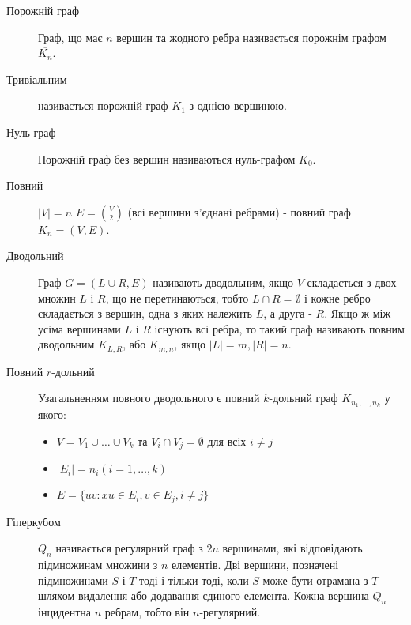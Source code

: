 \begin{description}
        \item[Порожній граф] Граф, що має $n$ вершин та жодного ребра називається порожнім графом $\overline{K_n}$.
        \item[Тривіальним] називається порожній граф $K_1$ з однією вершиною.
        \item[Нуль-граф] Порожній граф без вершин називаються нуль-графом $K_0$.
        \item[Повний] $\vert V \vert = n$ $E = {V \choose 2}$ (всі вершини з'єднані ребрами) - повний граф $K_n = (V,E)$.
        \item[Дводольний] Граф $G = (L \cup R,E)$ називають дводольним, якщо $V$ складається з двох множин $L$ і $R$, що не перетинаються, тобто $L \cap R = \emptyset$ і кожне ребро складається з вершин, одна з яких належить $L$, а друга - $R$. Якщо ж між усіма вершинами $L$ і $R$ існують всі ребра, то такий граф називають повним дводольним $K_{L,R}$, або $K_{m,n}$, якщо $\vert L \vert = m, \vert R \vert = n$.
        \item[Повний $r$-дольний] Узагальненням повного дводольного є повний $k$-дольний граф $K_{n_1,\dots,n_k}$ у якого:
        \begin{itemize}     
        \item $V=V_1 \cup \dots \cup V_k$ та $V_i \cap V_j = \emptyset$ для всіх $i \ne j$
        \item $\vert E_i \vert = n_i (i=1,\dots,k)$
        \item $E = \lbrace uv : xu \in E_i, v \in E_j, i \ne j \rbrace$
        \end{itemize}
        \item[Гіперкубом] $Q_n$ називається регулярний граф з $2n$ вершинами, які відповідають підмножинам множини з $n$ елементів. Дві вершини, позначені підмножинами $S$ і $T$ тоді і тільки тоді, коли $S$ може бути отрамана з $T$ шляхом видалення або додавання єдиного елемента. Кожна вершина $Q_n$ інцидентна $n$ ребрам, тобто він $n$-регулярний.
          
\end{description}
